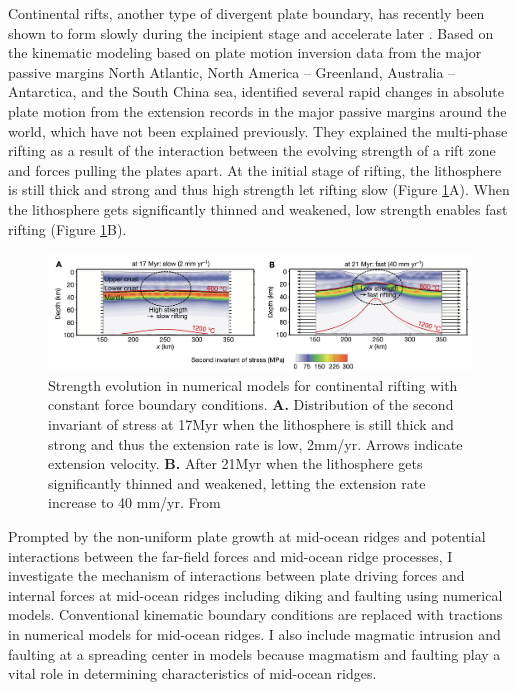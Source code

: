 \documentclass[letterpaper,12pt,notitle]{memphisthesis}                     %
\begin{document}
Continental rifts, another type of divergent plate boundary, has recently been shown to form slowly during the incipient stage and accelerate later \citep{Brune2016}. Based on the kinematic modeling based on plate motion inversion data from the major passive margins North Atlantic, North America – Greenland, Australia – Antarctica, and the South China sea, \citet{Brune2016} identified several rapid changes in absolute plate motion from the extension records in the major passive margins around the world, which have not been explained previously. They explained the multi-phase rifting as a result of the interaction between the evolving strength of a rift zone and forces pulling the plates apart. At the initial stage of rifting, the lithosphere is still thick and strong and thus high strength let rifting slow (Figure \ref{fig:brune}A). When the lithosphere gets significantly thinned and weakened, low strength enables fast rifting (Figure \ref{fig:brune}B).

\begin{figure}[!htb]
	\centering
	\includegraphics[width=0.99\linewidth]{./figs/brune.png}
	\caption{Strength evolution in numerical models for continental rifting with constant force boundary conditions. \textbf{A.} Distribution of the second invariant of stress at 17Myr when the lithosphere is still thick and strong and thus the extension rate is low, 2mm/yr. Arrows indicate extension velocity. \textbf{B.} After 21Myr when the lithosphere gets significantly thinned and weakened, letting the extension rate increase to 40 mm/yr. From \citet{Brune2016}}
	\label{fig:brune}
\end{figure}

Prompted by the non-uniform plate growth at mid-ocean ridges and potential interactions between the far-field forces and mid-ocean ridge processes, I investigate the mechanism of interactions between plate driving forces and internal forces at mid-ocean ridges including diking and faulting using numerical models. Conventional kinematic boundary conditions are replaced with tractions in numerical models for mid-ocean ridges. I also include magmatic intrusion and faulting at a spreading center in models because magmatism and faulting play a vital role in determining characteristics of mid-ocean ridges. 
\end{document}
